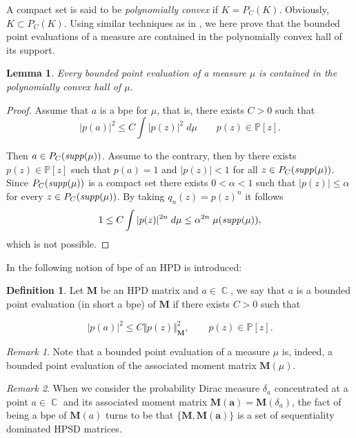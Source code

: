 \documentclass[12pt]{amsart}
\theoremstyle{definition}
\newtheorem{definition}{Definition}
\theoremstyle{plain}
\newtheorem{lem}{Lemma}
\theoremstyle{remark}
\newtheorem{remark}{Remark}
\DeclareMathOperator{\CC}{\mathbb C}
\begin{document}
\noindent A compact set is said to be {\it polynomially convex} if $K=P_C(K)$. Obviously, $K \subset P_C(K)$.  Using similar techniques as in \cite{EGT6}, we here prove that the bounded point evaluations of a measure are contained in the polynomially convex hall of its support. 



\begin{lem} Every bounded point evaluation of a measure $\mu$ is contained in the polynomially convex hall of $\mu$. 
\end{lem} 
\begin{proof} Assume that $a$ is a bpe for $\mu$, that is, there exists $C>0$ such that
$$
\vert p(a) \vert^2 \leq C\int \vert p(z) \vert^2 \; d\mu \qquad p(z)\in \mathbb{P}[z] .
$$

\noindent Then $a\in P_C({\it supp}(\mu))$. Assume to the contrary, then by \cite{Forstneric} there exists $p(z)\in \mathbb{P}[z]$ such that $p(a)=1$ and $\vert p(z)\vert<1$
for all $z\in P_C({\it supp}(\mu))$. Since $P_C({\it supp}(\mu))$ is a compact set there exists $0<\alpha <1$ such that $\vert p(z) \vert \leq \alpha$ for every $z\in P_C({\it supp}(\mu))$. By taking  $q_n(z)=p(z)^n$  it follows 
$$
1 \leq C\int \vert p(z) \vert^{2n} \; d\mu \leq \alpha^{2n}\;\mu({\it supp}(\mu)),
$$
\noindent which is  not possible. 
\end{proof} 

\noindent In \cite{EGT5} the following notion of bpe of an HPD is introduced: 
\begin{definition} Let $\mathbf{M}$ be an HPD matrix and  $a\in \CC$, we say that $a$ is a bounded point evaluation (in short a bpe)   of $\mathbf{M}$ if there exists  $C>0$ such that 

$$
\vert p(a) \vert^{2} \leq C \Vert p(z) \Vert^{2}_{\mathbf{M}}, \qquad p(z) \in \mathbb{P}[z].
$$
\end{definition}

\begin{remark} Note that a bounded point evaluation of a measure $\mu$ is,   indeed, a bounded point evaluation of the associated moment matrix  $\mathbf{M}(\mu)$. 
\end{remark}

\begin{remark} When we consider the probability Dirac measure $\delta_{a}$ concentrated at a point $a\in \CC$ and  its associated moment matrix $\mathbf{M(a)}=\mathbf{M}(\delta_{a})$, the fact of being a bpe of  $\mathbf{M}(a)$ turns to be that 
$\{\mathbf{M}, \mathbf{M(a)}\}$ is a set of sequentiality dominated HPSD matrices. 
\end{remark}
\end{document}
